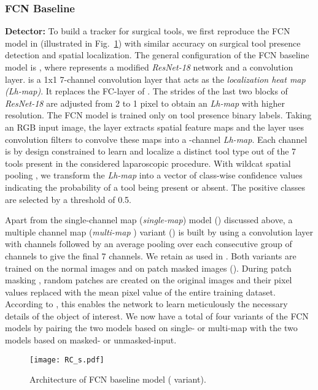 \documentclass{svjour3}                     \smartqed
\newcommand{\bd}[1]{\textbf{#1}}
\begin{document}
\subsubsection{FCN Baseline}\label{sec:baseline_fcn_model}
\bd{Detector: }
To build a tracker for surgical tools, we first reproduce the FCN model in \cite{miccai:vardazaryan2018weakly} (illustrated in Fig.~\ref{fig:fcn_baseline}) with similar accuracy on surgical tool presence detection and spatial localization. 
The general configuration of the FCN baseline model is , where  represents a modified \textit{ResNet-18} network and  a convolution layer. 
 is a 1x1 7-channel convolution layer that acts as the \textit{localization heat map (Lh-map)}. 
It replaces the FC-layer of . The strides of the last two blocks of \textit{ResNet-18} are adjusted from 2 to 1 pixel to obtain an \emph{Lh-map} with higher resolution.
The FCN model is trained only on tool presence binary labels.
Taking an RGB input image, the  layer extracts spatial feature maps and the  layer uses  convolution filters to convolve these maps into a -channel \emph{Lh-map}.
Each channel is by design constrained to learn and localize a distinct tool type out of the 7 tools present in the considered laparoscopic procedure.
With wildcat spatial pooling \cite{cvpr:durand2017wildcat}, we transform the \emph{Lh-map} into a  vector of class-wise confidence values indicating the probability of a tool being present or absent. The positive classes are selected by a threshold of 0.5.

Apart from the single-channel map (\textit{single-map}) model (\textit{}) discussed above, a multiple channel map (\textit{multi-map} \cite{cvpr:durand2017wildcat}) variant (\textit{}) is built by using a convolution layer with \textit{} channels followed by an average pooling over each consecutive group of  channels to give the final 7 channels. 
We retain \textit{} as used in \cite{miccai:vardazaryan2018weakly}. 
Both variants are trained on the normal images and on patch masked images (\textit{}). 
During patch masking \cite{iccv:singh2017hide}, random patches are created on the original images and their pixel values replaced with the mean pixel value of the entire training dataset. 
According to \cite{iccv:singh2017hide}, this enables the network to learn meticulously the necessary details of the object of interest. 
We now have a total of four variants of the FCN models by pairing the two models based on single- or multi-map with the two models based on masked- or unmasked-input.
\begin{figure}[t]\centering
        \texttt{[image: RC\_s.pdf]}
        \caption{Architecture of FCN baseline model ( variant).}
    \label{fig:fcn_baseline}
\end{figure}
\end{document}
